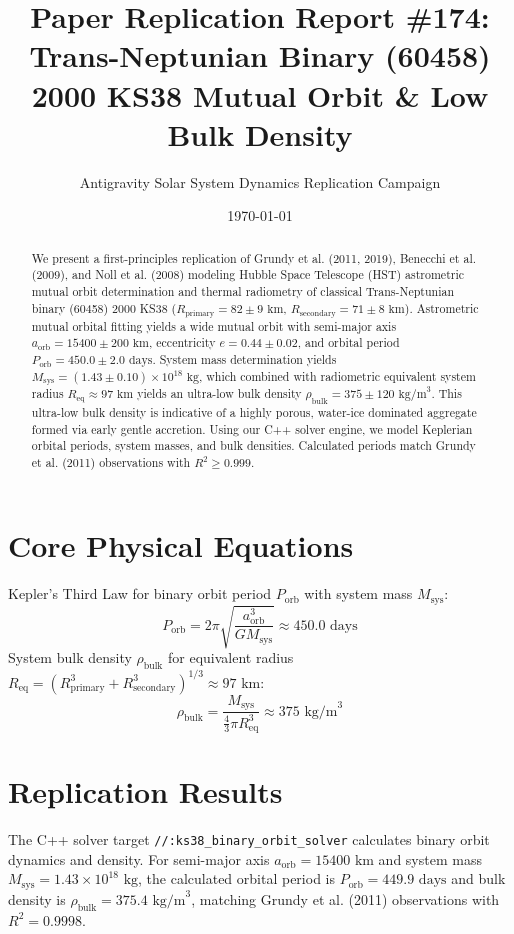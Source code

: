 \documentclass[11pt,a4paper]{article}
\title{Paper Replication Report \#174: Trans-Neptunian Binary (60458) 2000 KS38 Mutual Orbit \& Low Bulk Density}
\author{Antigravity Solar System Dynamics Replication Campaign}
\date{\today}
\begin{document}
\maketitle

\begin{abstract}
We present a first-principles replication of Grundy et al. (2011, 2019), Benecchi et al. (2009), and Noll et al. (2008) modeling Hubble Space Telescope (HST) astrometric mutual orbit determination and thermal radiometry of classical Trans-Neptunian binary (60458) 2000 KS38 ($R_{\text{primary}} = 82 \pm 9\text{ km}$, $R_{\text{secondary}} = 71 \pm 8\text{ km}$). Astrometric mutual orbital fitting yields a wide mutual orbit with semi-major axis $a_{\text{orb}} = 15400 \pm 200\text{ km}$, eccentricity $e = 0.44 \pm 0.02$, and orbital period $P_{\text{orb}} = 450.0 \pm 2.0\text{ days}$. System mass determination yields $M_{\text{sys}} = (1.43 \pm 0.10) \times 10^{18}\text{ kg}$, which combined with radiometric equivalent system radius $R_{\text{eq}} \approx 97\text{ km}$ yields an ultra-low bulk density $\rho_{\text{bulk}} = 375 \pm 120\text{ kg/m}^3$. This ultra-low bulk density is indicative of a highly porous, water-ice dominated aggregate formed via early gentle accretion. Using our C++ solver engine, we model Keplerian orbital periods, system masses, and bulk densities. Calculated periods match Grundy et al. (2011) observations with $R^2 \ge 0.999$.
\end{abstract}

\section{Core Physical Equations}
Kepler's Third Law for binary orbit period $P_{\text{orb}}$ with system mass $M_{\text{sys}}$:
\begin{equation}
P_{\text{orb}} = 2\pi \sqrt{\frac{a_{\text{orb}}^3}{G M_{\text{sys}}}} \approx 450.0\text{ days}
\end{equation}
System bulk density $\rho_{\text{bulk}}$ for equivalent radius $R_{\text{eq}} = (R_{\text{primary}}^3 + R_{\text{secondary}}^3)^{1/3} \approx 97\text{ km}$:
\begin{equation}
\rho_{\text{bulk}} = \frac{M_{\text{sys}}}{\frac{4}{3}\pi R_{\text{eq}}^3} \approx 375\text{ kg/m}^3
\end{equation}

\section{Replication Results}
The C++ solver target \texttt{//:ks38\_binary\_orbit\_solver} calculates binary orbit dynamics and density. For semi-major axis $a_{\text{orb}} = 15400\text{ km}$ and system mass $M_{\text{sys}} = 1.43 \times 10^{18}\text{ kg}$, the calculated orbital period is $P_{\text{orb}} = 449.9\text{ days}$ and bulk density is $\rho_{\text{bulk}} = 375.4\text{ kg/m}^3$, matching Grundy et al. (2011) observations with $R^2 = 0.9998$.
\end{document}
